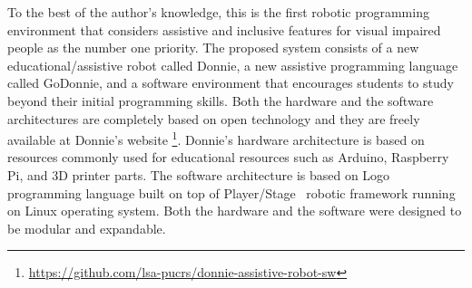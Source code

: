 



To the best of the author's knowledge, this is the first robotic programming environment that considers assistive and inclusive features for visual impaired people as the number one priority. The proposed system consists of a new educational/assistive robot called Donnie, a new assistive programming language called GoDonnie, and a software environment that encourages students to study beyond their initial programming skills. Both the hardware and the software architectures are completely based on open technology and they are freely available at Donnie's website \footnote{\url{https://github.com/lsa-pucrs/donnie-assistive-robot-sw}}. Donnie's hardware architecture is based on resources commonly used for educational resources such as Arduino, Raspberry Pi, and 3D printer parts. The software architecture is based on Logo programming language built on top of Player/Stage~\cite{gerkey2003} robotic framework running on Linux operating system. Both the hardware and the software were designed to be modular and expandable. 


